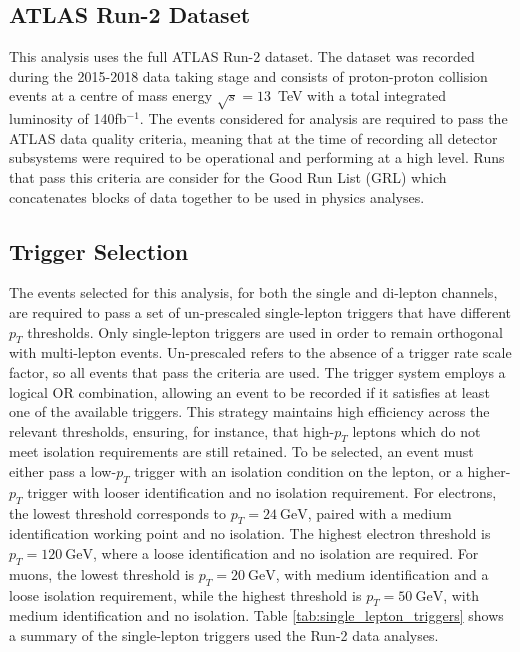\subsection{ATLAS Run-2 Dataset}
This analysis uses the full ATLAS Run-2 dataset. The dataset was recorded during the 2015-2018 data taking stage and consists of proton-proton collision events at a centre of mass energy $\sqrt{s}=13$~TeV with a total integrated luminosity of 140fb$^{-1}$. The events considered for analysis are required to pass the ATLAS data quality criteria, meaning that at the time of recording all detector subsystems were required to be operational and performing at a high level. Runs that pass this criteria are consider for the Good Run List (GRL) which concatenates blocks of data together to be used in physics analyses.
\subsection{Trigger Selection}
The events selected for this analysis, for both the single and di-lepton channels, are required to pass a set of un-prescaled single-lepton triggers that have different $p_T$ thresholds. Only single-lepton triggers are used in order to remain orthogonal with multi-lepton events. Un-prescaled refers to the absence of a trigger rate scale factor, so all events that pass the criteria are used. The trigger system employs a logical OR combination, allowing an event to be recorded if it satisfies at least one of the available triggers. This strategy maintains high efficiency across the relevant thresholds, ensuring, for instance, that high-$p_T$ leptons which do not meet isolation requirements are still retained. To be selected, an event must either pass a low-$p_T$ trigger with an isolation condition on the lepton, or a higher-$p_T$ trigger with looser identification and no isolation requirement. For electrons, the lowest threshold corresponds to $p_T = 24\ \mathrm{GeV}$, paired with a medium identification working point and no isolation. The highest electron threshold is $p_T = 120\ \mathrm{GeV}$, where a loose identification and no isolation are required. For muons, the lowest threshold is $p_T = 20\ \mathrm{GeV}$, with medium identification and a loose isolation requirement, while the highest threshold is $p_T = 50\ \mathrm{GeV}$, with medium identification and no isolation. Table \ref{tab:single_lepton_triggers} shows a summary of the single-lepton triggers used the Run-2 data analyses.
